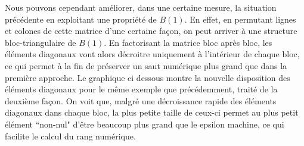 \documentclass{standalone}
\begin{document}
Nous pouvons cependant améliorer, dans une certaine mesure, la situation précédente en exploitant une propriété de $B(1)$. En effet, en permutant lignes et colones de cette matrice d'une certaine façon, on peut arriver à une structure bloc-triangulaire de $B(1)$.
En factorisant la matrice bloc après bloc, les éléments diagonaux vont alors décroitre uniquement à l'intérieur de chaque bloc, ce qui permet à la fin de préserver un saut numérique plus grand que dans la première approche. Le graphique ci dessous montre la nouvelle disposition des éléments diagonaux pour le même exemple que précédemment, traité de la deuxième façon.
On voit que, malgré une décroissance rapide des éléments diagonaux dans chaque bloc, la plus petite taille de ceux-ci permet au plus petit élément ``non-nul" d'être beaucoup plus grand que le epsilon machine, ce qui facilite le calcul du rang numérique.
\end{document}
